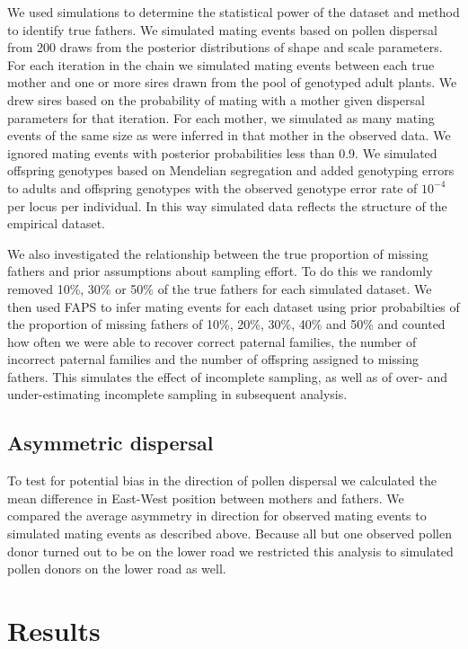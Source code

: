 \documentclass[10pt, a4paper, twocolumn]{article} %
\begin{document}
We used simulations to determine the statistical power of the dataset and method to identify true fathers.
We simulated mating events based on pollen dispersal from 200 draws from the posterior distributions of shape and scale parameters.
For each iteration in the chain we simulated mating events between each true mother and one or more sires drawn from the pool of genotyped adult plants.
We drew sires based on the probability of mating with a mother given dispersal parameters for that iteration.
For each mother, we simulated as many mating events of the same size as were inferred in that mother in the observed data.
We ignored mating events with posterior probabilities less than 0.9.
We simulated offspring genotypes based on Mendelian segregation and added genotyping errors to adults and offspring genotypes with the observed genotype error rate of $10^{-4}$ per locus per individual.
In this way simulated data reflects the structure of the empirical dataset.

We also investigated the relationship between the true proportion of missing fathers and prior assumptions about sampling effort.
To do this we randomly removed 10\%, 30\% or 50\% of the true fathers for each simulated dataset.
We then used FAPS to infer mating events for each dataset using prior probabilties of the proportion of missing fathers of 10\%, 20\%, 30\%, 40\% and 50\% and counted how often we were able to recover correct paternal families, the number of incorrect paternal families and the number of offspring assigned to missing fathers.
This simulates the effect of incomplete sampling, as well as of over- and under-estimating incomplete sampling in subsequent analysis.

\subsection{Asymmetric dispersal}

To test for potential bias in the direction of pollen dispersal we calculated the mean difference in East-West position between mothers and fathers.
We compared the average asymmetry in direction for observed mating events to simulated mating events as described above.
Because all but one observed pollen donor turned out to be on the lower road we restricted this analysis to simulated pollen donors on the lower road as well.

\section{Results}
\end{document}
